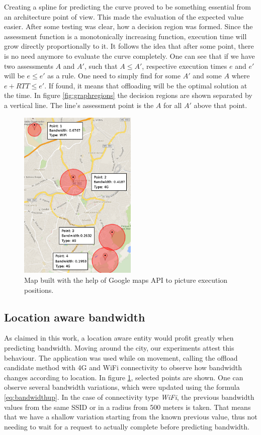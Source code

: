 \documentclass[10pt, conference, letterpaper]{IEEEtran}
\begin{document}
Creating a spline for predicting the curve proved to be something essential from an architecture point of view. This made the evaluation of the expected value easier. After some testing was clear, how a decision region was formed. Since the assessment function is a monotonically increasing function, execution time will grow directly proportionally to it. It follows the idea that after some point, there is no need anymore to evaluate the curve completely. One can see that if we have two assessments $A$ and $A'$, such that $A \leq A'$, respective execution times $e$ and $e'$ will be $e \leq e'$ as a rule. One need to simply find for some $A'$ and some $A$ where $e + RTT \leq e'$. If found, it means that offloading will be the optimal solution at the time. In figure \ref{fig:graphregions} the decision regions are shown separated by a vertical line. The line's assessment point is the $A$ for all $A'$ above that point.

\begin{figure}[!t]
  \centering
  \includegraphics[width=0.5\textwidth]{plots/map/map-plot.png}
  \caption{Map built with the help of Google maps API to picture execution positions.}
  \label{fig:mapplot}
\end{figure}

  \subsection{Location aware bandwidth}
  As claimed in this work, a location aware entity would profit greatly when predicting bandwidth. Moving around the city, our experiments attest this behaviour. The application was used while on movement, calling the offload candidate method with 4G and WiFi connectivity to observe how bandwidth changes according to location. In figure \ref{fig:mapplot}, selected points are shown. One can observe several bandwidth variations, which were updated using the formula \ref{eq:bandwidthup}. In the case of connectivity type \textit{WiFi}, the previous bandwidth values from the same SSID or in a radius from 500 meters is taken. That means that we have a shallow variation starting from the known previous value, thus not needing to wait for a request to actually complete before predicting bandwidth.
  
\end{document}
